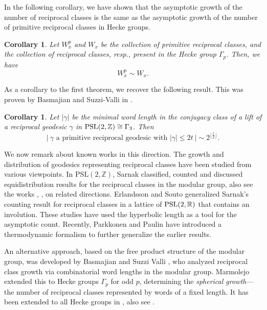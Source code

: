 \documentclass[11pt]{amsart}
\numberwithin{equation}{section}
\newtheorem{cor}[theorem]{Corollary}
\newcommand{\z}{\mathbb{Z}}
\numberwithin{equation}{section}
\begin{document}
In the following corollary, we have shown that the asymptotic growth of the number of reciprocal classes is the same as the asymptotic growth of the number of primitive reciprocal classes in Hecke groups. 
 \begin{cor}\label{cormain}
     Let $W^p_x$ and $W_x$ be the collection of primitive reciprocal classes, and the collection of reciprocal classes, resp., present in the Hecke group $\Gamma_p$. Then, we have
     \[W^p_x\sim W_x.\]
 \end{cor}
	As a corollary to the first theorem, we recover the following result. This was proven by  Basmajian and Suzzi-Valli in \cite[Theorem 1.1]{BV}. 
    \begin{cor}\label{1.4}
    Let $\left|\gamma\right|$ be the minimal word length in the conjugacy
	          	class of a lift of a reciprocal geodesic $\gamma$ in $\rm PSL(2,\z)\cong \Gamma_3$. Then
	          	$$\left|~\gamma \text{ a primitive reciprocal geodesic with }\left|\gamma\right|\leq 2t~\right|\sim 2^{\lfloor \frac{t}{2}\rfloor}. $$
	          	
	          	
	          \end{cor}
    
    \medspace
    
  

We now remark about known works in this direction.  The growth and distribution of geodesics representing reciprocal classes have been studied from various viewpoints.  In \( \mathrm{PSL}(2, \mathbb{Z}) \), Sarnak \cite{Sa} classified, counted and discussed equidistribution results for the reciprocal classes in the modular group, also see the works \cite{BK}, \cite{bv2}, \cite{bl} on related directions.  Erlandsson and Souto \cite{ES} generalized Sarnak's counting result for reciprocal classes in a lattice of ${\rm PSL}(2,\mathbb R)$ that contains an involution. These studies have used the hyperbolic length as a tool for the asymptotic count. Recently, Parkkonen and Paulin \cite{PP} have introduced a thermodynamic formalism to further generalize the earlier results.

An alternative approach, based on the free product structure of the modular group, was developed by Basmajian and Suzzi Valli \cite{BV}, who analyzed reciprocal class growth via combinatorial word lengths in the modular group. Marmolejo \cite{Ma} extended this to Hecke groups \( \Gamma_p \) for odd \( p \), determining the \emph{spherical growth}—the number of reciprocal classes represented by words of a fixed length. It has been extended to all Hecke groups in \cite{DG2}, also see \cite{bmv}. 
                            
\end{document}
